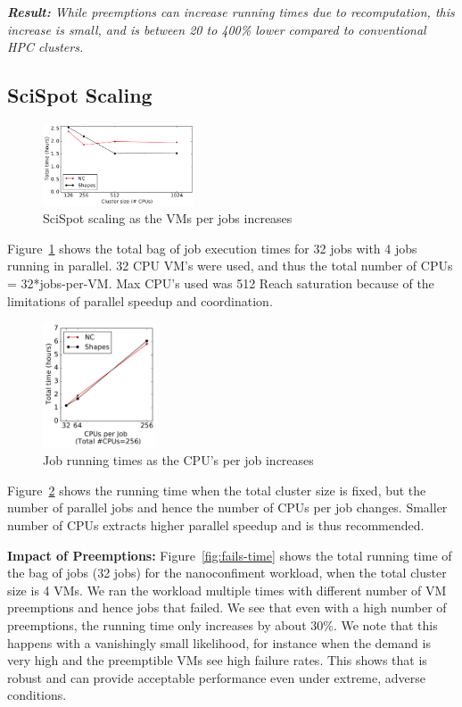 \noindent \emph{ \textbf{Result:} While preemptions can increase running times due to recomputation, this increase is small, and is between 20 to 400\% lower compared to conventional HPC clusters. }


\subsection{SciSpot Scaling}


\begin{figure}
  \includegraphics[width=0.4\textwidth]{../graphs/vm-per-job-scaling.pdf}
  \caption{SciSpot scaling as the VMs per jobs increases}
  \label{fig:vm-per-job-scaling}
\end{figure}

Figure~\ref{fig:vm-per-job-scaling} shows the total bag of job execution times for 32 jobs with 4 jobs running in parallel.
32 CPU VM's were used, and thus the total number of CPUs = 32*jobs-per-VM. Max CPU's used was 512 
Reach saturation because of the limitations of parallel speedup and coordination. 


\begin{figure}
  \includegraphics[width=0.3\textwidth]{../graphs/par-scaling.pdf}
  \caption{Job running times as the CPU's per job increases}
  \label{fig:par-scaling}
\end{figure}

Figure~\ref{fig:par-scaling} shows the running time when the total cluster size is fixed, but the number of parallel jobs and hence the number of CPUs per job changes. Smaller number of CPUs extracts higher parallel speedup and is thus recommended.


\noindent \textbf{Impact of Preemptions:} Figure~\ref{fig:fails-time} shows the total running time of the bag of jobs (32 jobs) for the nanoconfiment workload, when the total cluster size is 4 VMs. We ran the workload multiple times with different number of VM preemptions and hence jobs that failed. We see that even with a high number of preemptions, the running time only increases by about 30\%.
We note that this happens with a vanishingly small likelihood, for instance when the demand is very high and the preemptible VMs see high failure rates.
This shows that \sysname is robust and can provide acceptable performance even under extreme, adverse conditions. 

